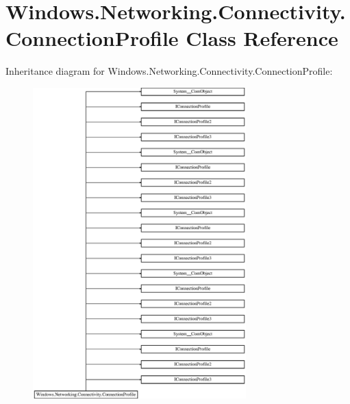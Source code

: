 \hypertarget{class_windows_1_1_networking_1_1_connectivity_1_1_connection_profile}{}\section{Windows.\+Networking.\+Connectivity.\+Connection\+Profile Class Reference}
\label{class_windows_1_1_networking_1_1_connectivity_1_1_connection_profile}
Inheritance diagram for Windows.\+Networking.\+Connectivity.\+Connection\+Profile\+:\begin{figure}[H]
\begin{center}
\leavevmode
\includegraphics[height=12.000000cm]{class_windows_1_1_networking_1_1_connectivity_1_1_connection_profile}
\end{center}
\end{figure}
